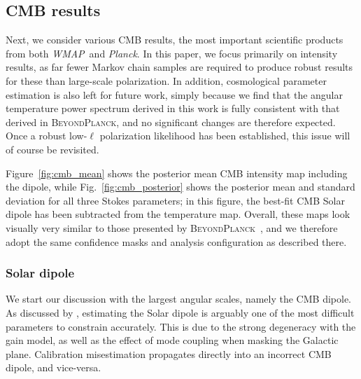 \documentclass[twocolumn]{../../common/aa}
\def\WMAP{\emph{WMAP}}
\def\Planck{\emph{Planck}}
\newcommand{\BP}{\textsc{BeyondPlanck}}
\newcommand{\bp}{\textsc{BeyondPlanck}}
\begin{document}



\subsection{CMB results}
\label{sec:cmb}


Next, we consider various CMB results, the most important scientific products from both \WMAP\ and \Planck. In this paper, we focus primarily on intensity results, as far fewer Markov chain samples are required to produce robust results for these than large-scale polarization. In addition, cosmological parameter estimation is also left for future work, simply because we find that the angular temperature power spectrum derived in this work is fully consistent with that derived in \BP, and no significant changes are therefore expected. Once a robust low-$\ell$ polarization likelihood has been established, this issue will of course be revisited.

Figure~\ref{fig:cmb_mean} shows the posterior mean CMB intensity map including the dipole, while Fig.~\ref{fig:cmb_posterior} shows the posterior mean and standard deviation for all three Stokes parameters; in this figure, the best-fit CMB Solar dipole has been subtracted from the temperature map. Overall, these maps look visually very similar to those presented by \bp\ \citep{bp13}, and we therefore adopt the same confidence masks and analysis configuration as described there.



\subsubsection{Solar dipole}
\label{sec:dipole}

We start our discussion with the largest angular scales, namely the CMB dipole. As discussed by \citet{thommesen:2019}, estimating the Solar dipole is arguably one of the most difficult parameters to constrain accurately. This is due to the strong degeneracy with the gain model, as well as the effect of mode coupling when masking the Galactic plane. Calibration misestimation propagates directly into an incorrect CMB dipole, and vice-versa.
\end{document}
